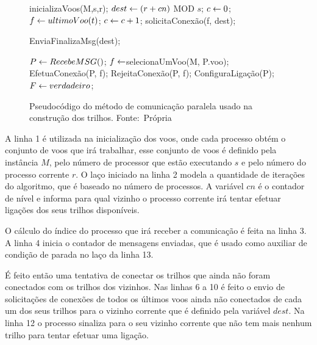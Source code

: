 \begin{figure}[h]
\caption{Pseudocódigo do método de comunicação paralela usado na construção dos
trilhos.
\newline
\mbox{Fonte: Própria}}\label{alg:metodoparalel}
\begin{programma}

\STATE inicializaVoos(M,s,r);
\STATE $dest \leftarrow (r + cn)$ MOD $s$;
\STATE $c \leftarrow 0$;
\STATE $f \leftarrow ultimoVoo(t)$;
	\STATE $c \leftarrow c + 1$;
	\STATE solicitaConexão(f, dest);
	\ENDIF
\ENDFOR

\STATE EnviaFinalizaMsg(dest);

	\STATE $P \leftarrow RecebeMSG()$;
		\STATE $f \leftarrow $selecionaUmVoo(M, P.voo);
			\STATE EfetuaConexão(P, f);
		\ELSE
			\STATE RejeitaConexão(P, f);
		\ENDIF
		\STATE ConfiguraLigação(P);
		\STATE $F \leftarrow verdadeiro$;
	\ENDIF 
	
\ENDWHILE
\ENDFOR

\ENDALGORITHM
\end{programma}
\end{figure} 


A linha 1 é utilizada na inicialização dos voos, onde cada processo obtém o
conjunto de voos que irá trabalhar, esse conjunto de voos é definido pela
instância $M$, pelo número de processor que estão executando $s$ e pelo número
do processo corrente $r$. O laço iniciado na linha 2 modela a quantidade de
iterações do algoritmo, que é baseado no número de processos. A variável $cn$ é
o contador de nível e informa para qual vizinho o processo corrente irá tentar
efetuar ligações dos seus trilhos disponíveis.

O cálculo do índice do processo que irá receber a comunicação é feita na linha
3. A linha 4 inicia o contador de mensagens enviadas, que é usado como auxiliar
de condição de parada no laço da linha 13.

É feito então uma tentativa de conectar os trilhos que ainda não
foram conectados com os trilhos dos vizinhos. Nas linhas 6 a 10 é
feito o envio de solicitações de conexões de todos os últimos voos ainda não
conectados de cada um dos seus trilhos para o vizinho corrente que é definido
pela variável $dest$. Na linha 12 o processo sinaliza para o seu vizinho
corrente que não tem mais nenhum trilho para tentar efetuar uma ligação.


